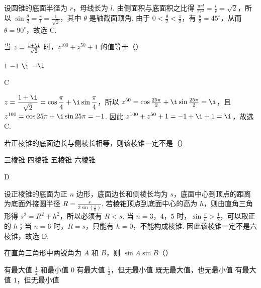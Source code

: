\documentclass[UTF8,a4paper,oneside,11pt]{ctexbook}
\begin{document}
\begin{solution}
设圆锥的底面半径为 \(r\)，母线长为 \(l\). 由侧面积与底面积之比得
\(\displaystyle \frac{\pi rl}{\pi r^2}=\frac{l}{r}=\sqrt{2}\)，所以 \(\sin\frac{\theta}{2}=\frac{r}{l}=\frac{1}{\sqrt{2}}\)，其中 \(\theta\) 是轴截面顶角. 由于 \(0<\frac{\theta}{2}<\frac{\pi}{2}\)，有 \(\frac{\theta}{2}=45^\circ\)，从而 \(\theta=90^\circ\)，故选 C.
\end{solution}

\begin{problem}
当 \(z = \frac{1 + \i}{\sqrt{2}}\) 时，\(z^{100} + z^{50} + 1\) 的值等于（\quad）

\choices
    {\(1\)}
    {\(-1\)}
    {\(\i\)}
    {\(-\i\)}
\end{problem}

\begin{answer}
C
\end{answer}

\begin{solution}
\(\displaystyle z=\frac{1+\i}{\sqrt{2}}=\cos\frac{\pi}{4}+\i\sin\frac{\pi}{4}\)，所以
\(z^{50}=\cos\frac{25\pi}{2}+\i\sin\frac{25\pi}{2}=\i\)，且 \(z^{100}=\cos25\pi+\i\sin25\pi=-1\). 因此 \(z^{100}+z^{50}+1=-1+\i+1=\i\)，故选 C.
\end{solution}

\begin{problem}
若正棱锥的底面边长与侧棱长相等，则该棱锥一定不是（\quad）

\choices
    {三棱锥}
    {四棱锥}
    {五棱锥}
    {六棱锥}
\end{problem}

\begin{answer}
D
\end{answer}

\begin{solution}
设正棱锥的底面为正 \(n\) 边形，底面边长和侧棱长均为 \(s\)，底面中心到顶点的距离为底面外接圆半径 \(R=\frac{s}{2\sin(\frac{\pi}{n})}\). 若棱锥顶点到底面中心的高为 \(h\)，则由直角三角形得 \(s^2=R^2+h^2\)，所以必须有 \(R<s\). 当 \(n=3\)，\(4\)，\(5\) 时，\(\sin\frac{\pi}{n}>\frac{1}{2}\)，可以取正的 \(h\)；当 \(n=6\) 时，\(R=s\)，只能有 \(h=0\)，不能构成棱锥. 因此该棱锥一定不是六棱锥，故选 D.
\end{solution}

\begin{problem}
在直角三角形中两锐角为 \(A\) 和 \(B\)，则 \(\sin A\sin B\)（\quad）

\choices
    {有最大值 \(\frac{1}{2}\) 和最小值 \(0\)}
    {有最大值 \(\frac{1}{2}\)，但无最小值}
    {既无最大值，也无最小值}
    {有最大值 \(1\)，但无最小值}
\end{problem}
\end{document}
